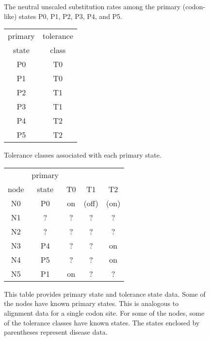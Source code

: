 \documentclass{article}
\begin{document}
\begin{figure}
\centering
{}
\caption{
	The neutral unscaled substitution rates
	among the primary (codon-like) states
	P0, P1, P2, P3, P4, and P5.
}
\end{figure}

\begin{figure}
\centering
\begin{tabular}{c c}
  primary & tolerance \\
  state & class \\
  \hline
  P0 & T0 \\
  P1 & T0 \\
  P2 & T1 \\
  P3 & T1 \\
  P4 & T2 \\
  P5 & T2
\end{tabular}
\caption{Tolerance classes associated with each primary state.}
\end{figure}

\begin{figure}
\centering
\begin{tabular}{c c c c c}
	     & primary &    &    &    \\
	node & state   & T0 & T1 & T2 \\
  \hline
  N0 & P0 & on & (off) & (on) \\
  N1 & ? & ? & ? & ? \\
  N2 & ? & ? & ? & ? \\
  N3 & P4 & ? & ? & on \\
  N4 & P5 & ? & ? & on \\
  N5 & P1 & on & ? & ?
\end{tabular}
\caption{
	This table provides primary state and tolerance state data.
	Some of the nodes have known primary states.
	This is analogous to alignment data for a single codon site.
	For some of the nodes,
	some of the tolerance classes have known states.
	The states enclosed by parentheses represent
	disease data.
}
\end{figure}
\end{document}

